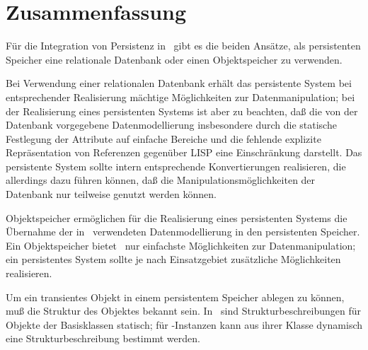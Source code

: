 \section{Zusammenfassung}
%
F\"{u}r die Integration von Persistenz in \clos\ gibt es die beiden
Ans\"{a}tze, als persistenten Speicher eine relationale Datenbank oder
einen Objektspeicher zu verwenden.
%
\par{}Bei Verwendung einer relationalen Datenbank erh\"{a}lt das
persistente System bei entsprechender Realisierung m\"{a}chtige
M\"{o}glichkeiten zur Datenmanipulation; bei der Realisierung eines
persistenten Systems ist aber zu beachten, da\ss{} die von der Datenbank
vorgegebene Datenmodellierung insbesondere durch die statische
Festlegung der Attribute auf einfache Bereiche und die fehlende
explizite Repr\"{a}sentation von Referenzen gegen\"{u}ber LISP eine
Einschr\"{a}nkung darstellt. Das persistente System sollte intern
entsprechende Konvertierungen realisieren, die allerdings dazu f\"{u}hren
k\"{o}nnen, da\ss{} die Manipulationsm\"{o}glichkeiten der Datenbank nur
teilweise genutzt werden k\"{o}nnen.
%
\par{}Objektspeicher erm\"{o}glichen f\"{u}r die Realisierung eines
persistenten Systems die \"{U}bernahme der in \cl\ verwendeten
Datenmodellierung in den persistenten Speicher. Ein Objektspeicher
bietet \ia\ nur einfachste M\"{o}glichkeiten zur Datenmanipulation; ein
persistentes System sollte je nach Einsatzgebiet zus\"{a}tzliche
M\"{o}glichkeiten realisieren.
%
\par{}Um ein transientes Objekt in einem persistentem Speicher ablegen
zu k\"{o}nnen, mu\ss{} die Struktur des Objektes bekannt sein. In \cl\ sind
Strukturbeschreibungen f\"{u}r Objekte der Basisklassen statisch;
f\"{u}r \clos-Instanzen kann aus ihrer Klasse dynamisch eine
Strukturbeschreibung bestimmt werden.
